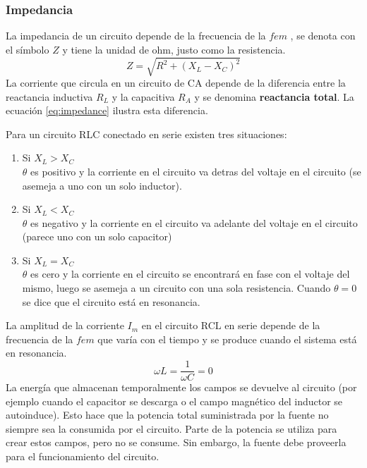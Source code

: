 \documentclass[spanish,notitlepage,letterpaper, 12pt]{article}
\begin{document}
\subsubsection{Impedancia}
La impedancia de un circuito depende de la frecuencia de la $fem$ , se denota con
el símbolo $Z$ y tiene la unidad de ohm, justo como la resistencia.
\begin{equation}\label{eq:impedance}
    Z=\sqrt{R^2+(X_L-X_C)^2}
\end{equation}
La corriente que circula en un circuito de CA depende de la diferencia entre la reactancia inductiva $R_L$ y la capacitiva $R_A$ y se denomina \textbf{reactancia total}. La ecuación \eqref{eq:impedance} ilustra esta diferencia.\par
\bigskip
Para un circuito RLC conectado en serie existen tres situaciones:
\begin{enumerate}
    \item Si $X_L>X_C$\\
        $\theta$ es positivo y la corriente en el circuito va detras del voltaje en el circuito (se asemeja a uno con un solo inductor).
    \item Si $X_L<X_C$\\
        $\theta$ es negativo y la corriente en el circuito va adelante del voltaje en el circuito (parece uno con un solo capacitor) 
    \item Si $X_L=X_C$\\
        $\theta$ es cero y la corriente en el circuito se encontrará en fase con el voltaje del mismo, luego se asemeja a un circuito con una sola resistencia. Cuando $\theta=0$ se dice que el circuito está en resonancia.
\end{enumerate}
La amplitud de la corriente $I_m$ en el circuito RCL en serie depende de la frecuencia de la $fem$ que varía con el tiempo y se produce cuando el sistema está en resonancia.
\begin{equation}
    \omega L=\frac{1}{\omega C}=0
\end{equation}
La energía que almacenan temporalmente los campos se devuelve al circuito (por ejemplo cuando el capacitor se descarga o el campo magnético del
inductor se autoinduce). Esto hace que la potencia total suministrada por la
fuente no siempre sea la consumida por el circuito. Parte de la potencia se utiliza para crear estos campos, pero no se consume. Sin embargo, la fuente debe proveerla para el funcionamiento del circuito.
\end{document}

